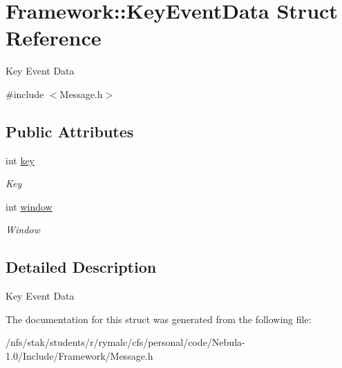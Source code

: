 \hypertarget{structFramework_1_1KeyEventData}{
\section{Framework::KeyEventData Struct Reference}
\label{structFramework_1_1KeyEventData}
}


Key Event Data  


{\ttfamily \#include $<$Message.h$>$}\subsection*{Public Attributes}
\begin{DoxyCompactItemize}
\item 
\hypertarget{structFramework_1_1KeyEventData_a92160007d1be32a97180b4e0c75d7642}{
int \hyperlink{structFramework_1_1KeyEventData_a92160007d1be32a97180b4e0c75d7642}{key}}
\label{structFramework_1_1KeyEventData_a92160007d1be32a97180b4e0c75d7642}

\begin{DoxyCompactList}\small\item\em Key \item\end{DoxyCompactList}\item 
\hypertarget{structFramework_1_1KeyEventData_a08e5b27a3220a3ad9a5accc9fa197546}{
int \hyperlink{structFramework_1_1KeyEventData_a08e5b27a3220a3ad9a5accc9fa197546}{window}}
\label{structFramework_1_1KeyEventData_a08e5b27a3220a3ad9a5accc9fa197546}

\begin{DoxyCompactList}\small\item\em Window \item\end{DoxyCompactList}\end{DoxyCompactItemize}


\subsection{Detailed Description}
Key Event Data 

The documentation for this struct was generated from the following file:\begin{DoxyCompactItemize}
\item 
/nfs/stak/students/r/rymalc/cfs/personal/code/Nebula-\/1.0/Include/Framework/Message.h\end{DoxyCompactItemize}
